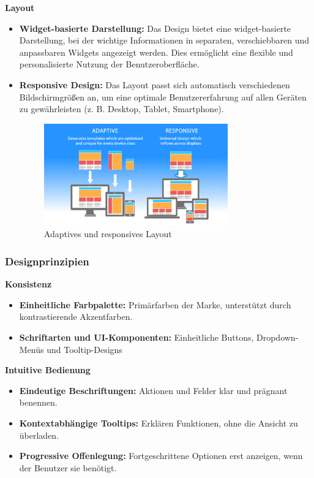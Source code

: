 \textbf{Layout}
\begin{itemize}
	\item \textbf{Widget-basierte Darstellung:} Das Design bietet eine widget-basierte Darstellung, bei der wichtige Informationen in separaten, verschiebbaren und anpassbaren Widgets angezeigt werden. Dies ermöglicht eine flexible und personalisierte Nutzung der Benutzeroberfläche.
	\item \textbf{Responsive Design:} Das Layout passt sich automatisch verschiedenen Bildschirmgrößen an, um eine optimale Benutzererfahrung auf allen Geräten zu gewährleisten (z. B. Desktop, Tablet, Smartphone).
	
	\begin{figure}
		\centering
		\includegraphics[width=0.75\textwidth]{images/responsive-vs-adaptive.png}
		\caption{Adaptives und responsives Layout\textit{\cite{responsive_vs_adaptive_image}}}
	\end{figure}
\end{itemize}


\subsubsection{Designprinzipien}

\textbf{Konsistenz}
\begin{itemize}
	\item \textbf{Einheitliche Farbpalette:} Primärfarben der Marke, unterstützt durch kontrastierende Akzentfarben. \textit{\cite{ux_usability}}
	\item \textbf{Schriftarten und UI-Komponenten:} Einheitliche Buttons, Dropdown-Menüs und Tooltip-Designs \textit{\cite{ux_usability}}
\end{itemize}

\textbf{Intuitive Bedienung}
\begin{itemize}
	\item \textbf{Eindeutige Beschriftungen:} Aktionen und Felder klar und prägnant benennen.
	\item \textbf{Kontextabhängige Tooltips:} Erklären Funktionen, ohne die Ansicht zu überladen.
	\item \textbf{Progressive Offenlegung:} Fortgeschrittene Optionen erst anzeigen, wenn der Benutzer sie benötigt.
\end{itemize}

